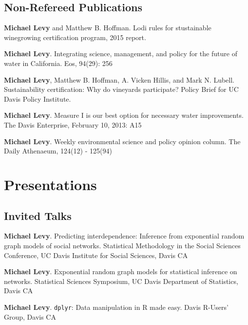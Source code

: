 \subsection{Non-Refereed Publications}\label{non-refereed-publications}

\begin{description}
\tightlist
\item[2015]
\textbf{Michael Levy} and Matthew B. Hoffman. Lodi rules for
stustainable winegrowing certification program, 2015 report.
\item[2013]
\textbf{Michael Levy}. Integrating science, management, and policy for
the future of water in California. Eos, 94(29): 256
\item[2013]
\textbf{Michael Levy}, Matthew B. Hoffman, A. Vicken Hillis, and Mark N.
Lubell. Sustainability certification: Why do vineyards participate?
Policy Brief for UC Davis Policy Institute.
\item[2013]
\textbf{Michael Levy}. Measure I is our best option for necessary water
improvements. The Davis Enterprise, February 10, 2013: A15
\item[2010 - 2012]
\textbf{Michael Levy}. Weekly environmental science and policy opinion
column. The Daily Athenaeum, 124(12) - 125(94)
\end{description}

\section{Presentations}\label{presentations}

\subsection{Invited Talks}\label{invited-talks}

\begin{description}
\tightlist
\item[2015]
\textbf{Michael Levy}. Predicting interdependence: Inference from
exponential random graph models of social networks. Statistical
Methodology in the Social Sciences Conference, UC Davis Institute for
Social Sciences, Davis CA
\item[2015]
\textbf{Michael Levy}. Exponential random graph models for statistical
inference on networks. Statistical Sciences Symposium, UC Davis
Department of Statistics, Davis CA
\item[2014]
\textbf{Michael Levy}. \texttt{dplyr}: Data manipulation in R made easy.
Davis R-Users' Group, Davis CA
\end{description}

